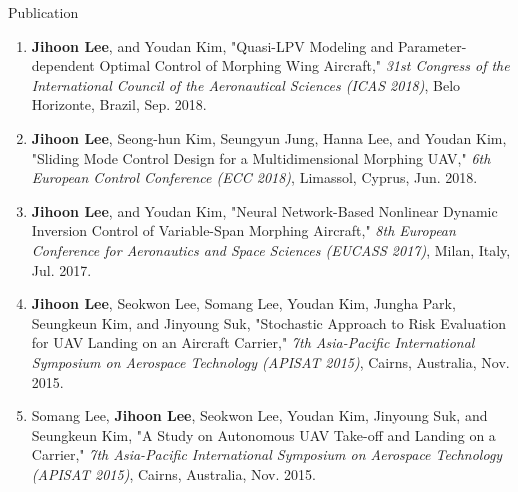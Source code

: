 \documentclass{resume}
\begin{document}
\begin{rSection}{Publication}
\begin{enumerate}
		\item \textbf{\color{coolblack}Jihoon Lee}, and Youdan Kim, "Quasi-LPV Modeling and Parameter-dependent Optimal Control of Morphing Wing Aircraft," \textit{31st Congress of the International Council of the Aeronautical Sciences (ICAS 2018)}, Belo Horizonte, Brazil, Sep. 2018. 
		
		\item \textbf{\color{coolblack}Jihoon Lee}, Seong-hun Kim, Seungyun Jung, Hanna Lee, and Youdan Kim, "Sliding Mode Control Design for a Multidimensional Morphing UAV," \textit{6th European Control Conference (ECC 2018)}, Limassol, Cyprus, Jun. 2018. 
		
		\item \textbf{\color{coolblack}Jihoon Lee}, and Youdan Kim, "Neural Network-Based Nonlinear Dynamic Inversion Control of Variable-Span Morphing Aircraft," \textit{8th European Conference for Aeronautics and Space Sciences (EUCASS 2017)}, Milan, Italy, Jul. 2017. 
		
		\item \textbf{\color{coolblack}Jihoon Lee}, Seokwon Lee, Somang Lee, Youdan Kim, Jungha Park, Seungkeun Kim, and Jinyoung Suk, "Stochastic Approach to Risk Evaluation for UAV Landing on an Aircraft Carrier," \textit{7th Asia-Pacific International Symposium on Aerospace Technology (APISAT 2015)}, Cairns, Australia, Nov. 2015. 
		
		\item Somang Lee, \textbf{\color{coolblack}Jihoon Lee}, Seokwon Lee, Youdan Kim, Jinyoung Suk, and Seungkeun Kim, "A Study on Autonomous UAV Take-off and Landing on a Carrier," \textit{7th Asia-Pacific International Symposium on Aerospace Technology (APISAT 2015)}, Cairns, Australia, Nov. 2015. 
	\end{enumerate}\renewcommand{\labelenumi}{\theenumi.}
		

\end{rSection}
\end{document}
